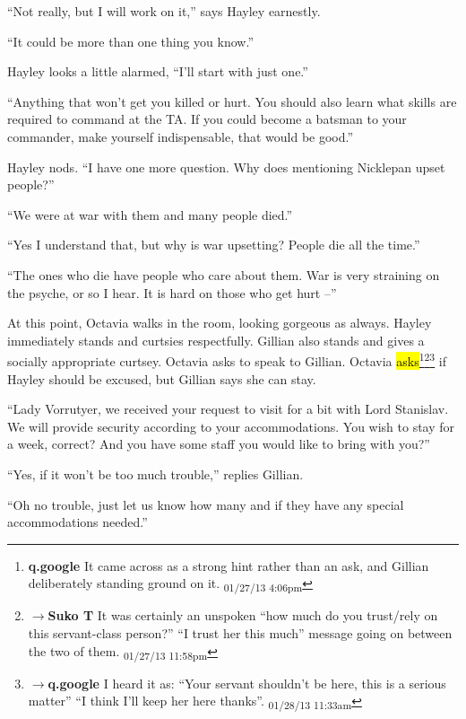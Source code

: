 ``Not really, but I will work on it,'' says Hayley earnestly. 

``It could be more than one thing you know.''

Hayley looks a little alarmed, ``I'll start with just one.''

``Anything that won't get you killed or hurt.  You should also learn what skills are required to command at the TA.  If you could become a batsman to your commander, make yourself indispensable, that would be good.''

Hayley nods.  ``I have one more question.  Why does mentioning Nicklepan upset people?''

``We were at war with them and many people died.''

``Yes I understand that, but why is war upsetting?  People die all the time.''

``The ones who die have people who care about them.  War is very straining on the psyche, or so I hear.  It is hard on those who get hurt --''



At this point, Octavia walks in the room, looking gorgeous as always.  Hayley immediately stands and curtsies respectfully.  Gillian also stands and gives a socially appropriate curtsey.  Octavia asks to speak to Gillian.  Octavia \hl{asks}\footnote{\textbf{q.google }It came across as a strong hint rather than an ask, and Gillian deliberately standing ground on it. \textsubscript{01/27/13 4:06pm}}\footnote{$\rightarrow$\textbf{Suko T }It was certainly an unspoken ``how much do you trust/rely on this servant-class person?'' ``I trust her this much'' message going on between the two of them. \textsubscript{01/27/13 11:58pm}}\footnote{$\rightarrow$\textbf{q.google }I heard it as: ``Your servant shouldn't be here, this is a serious matter'' ``I think I'll keep her here thanks''. \textsubscript{01/28/13 11:33am}} if Hayley should be excused, but Gillian says she can stay.  



``Lady Vorrutyer, we received your request to visit for a bit with Lord Stanislav.  We will provide security according to your accommodations.  You wish to stay for a week, correct?  And you have some staff you would like to bring with you?''

``Yes, if it won't be too much trouble,'' replies Gillian.

``Oh no trouble, just let us know how many and if they have any special accommodations needed.''

